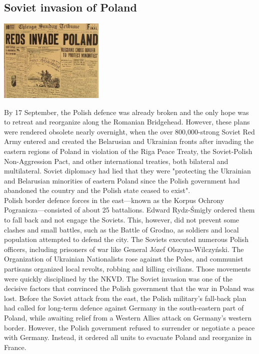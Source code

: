 \documentclass[11pt]{report}
\begin{document}
\subsection{Soviet invasion of Poland}
\vspace{2mm}\begin{center}\includegraphics[width=5cm]{./img/ussrInvPol.jpg}\end{center}
By 17 September, the Polish defence was already broken and the only hope was to retreat and reorganize along the Romanian Bridgehead. However, these plans were rendered obsolete nearly overnight, when the over 800,000-strong Soviet Red Army entered and created the Belarusian and Ukrainian fronts after invading the eastern regions of Poland in violation of the Riga Peace Treaty, the Soviet-Polish Non-Aggression Pact, and other international treaties, both bilateral and multilateral. Soviet diplomacy had lied that they were "protecting the Ukrainian and Belarusian minorities of eastern Poland since the Polish government had abandoned the country and the Polish state ceased to exist".\\
\indent Polish border defence forces in the east—known as the Korpus Ochrony Pogranicza—consisted of about 25 battalions. Edward Rydz-Śmigły ordered them to fall back and not engage the Soviets. This, however, did not prevent some clashes and small battles, such as the Battle of Grodno, as soldiers and local population attempted to defend the city. The Soviets executed numerous Polish officers, including prisoners of war like General Józef Olszyna-Wilczyński. The Organization of Ukrainian Nationalists rose against the Poles, and communist partisans organized local revolts, robbing and killing civilians. Those movements were quickly disciplined by the NKVD. The Soviet invasion was one of the decisive factors that convinced the Polish government that the war in Poland was lost. Before the Soviet attack from the east, the Polish military's fall-back plan had called for long-term defence against Germany in the south-eastern part of Poland, while awaiting relief from a Western Allies attack on Germany's western border. However, the Polish government refused to surrender or negotiate a peace with Germany. Instead, it ordered all units to evacuate Poland and reorganize in France.
\end{document}
